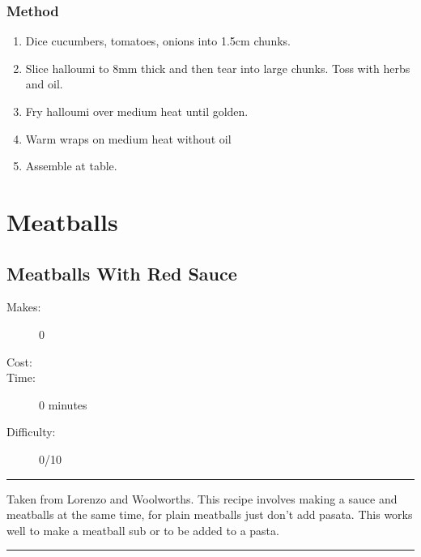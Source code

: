 \documentclass[]{article}
\begin{document}
\subsubsection*{\Large Method}
\begin{enumerate}[font=\huge\color{accent}]
	\item Dice cucumbers, tomatoes, onions into 1.5cm chunks.
	\item Slice halloumi to 8mm thick and then tear into large chunks. Toss with herbs and oil.
	\item Fry halloumi over medium heat until golden.
	\item Warm wraps on medium heat without oil
	\item Assemble at table.
\end{enumerate}
\newpage
{}
\section*{\center\Huge\color{accent}Meatballs}
\label{cat:Meatballs}
\label{rec:Meatballs With Red Sauce}
\subsection*{\center\huge Meatballs With Red Sauce}
\begin{description}
\item[Makes:] 0 
\item[Cost:] \textdollar
\item[Time:] 0 minutes
\item[Difficulty:] 0/10
\end{description}
\vspace{0.2cm}\hrule\vspace{0.5cm}
\begin{adjustwidth}{0.5 cm}{0.5 cm}

Taken from Lorenzo and Woolworths. This recipe involves making a sauce and meatballs at the same time, for plain meatballs just don't add pasata. This works well to make a meatball sub or to be added to a pasta. 

\end{adjustwidth}
\vspace{0.5cm}\hrule
\end{document}
